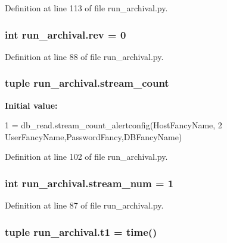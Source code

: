 Definition at line 113 of file run\-\_\-archival.\-py.

\hypertarget{namespacerun__archival_a0fe00f8ef6c40a90a1d41ecea3f75e7b}{
\subsubsection[{rev}]{\setlength{\rightskip}{0pt plus 5cm}int run\-\_\-archival.\-rev = 0}}\label{namespacerun__archival_a0fe00f8ef6c40a90a1d41ecea3f75e7b}


Definition at line 88 of file run\-\_\-archival.\-py.

\hypertarget{namespacerun__archival_a1aa2ba0984af9e6525f66fb7d1f912d5}{
\subsubsection[{stream\-\_\-count}]{\setlength{\rightskip}{0pt plus 5cm}tuple run\-\_\-archival.\-stream\-\_\-count}}\label{namespacerun__archival_a1aa2ba0984af9e6525f66fb7d1f912d5}
{\bfseries Initial value\-:}
\begin{DoxyCode}
1 = db\_read.stream\_count\_alertconfig(HostFancyName,
2                           UserFancyName,PasswordFancy,DBFancyName)
\end{DoxyCode}


Definition at line 102 of file run\-\_\-archival.\-py.

\hypertarget{namespacerun__archival_a5a97b1e71d6ad7513865ee536b7b4dea}{
\subsubsection[{stream\-\_\-num}]{\setlength{\rightskip}{0pt plus 5cm}int run\-\_\-archival.\-stream\-\_\-num = 1}}\label{namespacerun__archival_a5a97b1e71d6ad7513865ee536b7b4dea}


Definition at line 87 of file run\-\_\-archival.\-py.

\hypertarget{namespacerun__archival_ae4106daf64be22b10853a0d056069368}{
\subsubsection[{t1}]{\setlength{\rightskip}{0pt plus 5cm}tuple run\-\_\-archival.\-t1 = time()}}\label{namespacerun__archival_ae4106daf64be22b10853a0d056069368}


